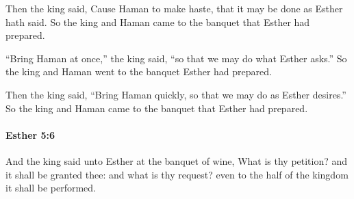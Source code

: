 			\begin{versebox}
					\item[BHS] 
					\item[LXX] 
					\item[ASV] Then the king said, Cause Haman to make haste, that it may be done as Esther hath said. So the king and Haman came to the banquet that Esther had prepared.
					\item[NIV] “Bring Haman at once,” the king said, “so that we may do what Esther asks.” So the king and Haman went to the banquet Esther had prepared.
					\item[NRSV] Then the king said, “Bring Haman quickly, so that we may do as Esther desires.” So the king and Haman came to the banquet that Esther had prepared.
			\end{versebox}

		\paragraph{Esther 5:6} %
			\label{ESTHER-5-6}

			And the king said unto Esther at the banquet of wine, What is thy petition? and it shall be granted thee: and what is thy request? even to the half of the kingdom it shall be performed.

